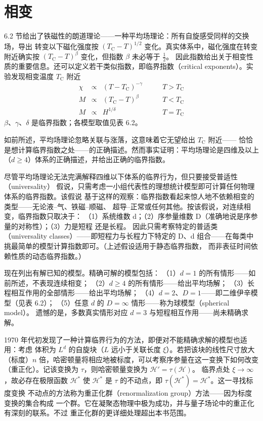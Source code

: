 \section{相变}

6.2 节给出了铁磁性的朗道理论——一种平均场理论：所有自旋感受同样的交换场，导出
转变以下磁化强度按 $(T_{\mathrm{C}}-T)^{1/2}$ 变化。真实体系中，磁化强度在转变
附近确实按 $(T_{\mathrm{C}}-T)^{\beta}$ 变化，但指数 $\beta$ 未必等于 $\frac{1}{2}$。
因此指数给出关于相变性质的重要信息。还可以定义若干类似指数，即临界指数（critical
exponents）。实验发现相变温度 $T_{\mathrm{C}}$ 附近
\begin{equation*}
\begin{array}{cccl}
\chi & \propto & (T-T_{\mathrm{C}})^{-\gamma} & \qquad T>T_{\mathrm{C}}\\
M & \propto & (T_{\mathrm{C}}-T)^{\beta} & \qquad T<T_{\mathrm{C}}\\
M & \propto & H^{1/\delta} & \qquad T=T_{\mathrm{C}}
\end{array}\tag{6.7}
\end{equation*}
$\beta$、$\gamma$、$\delta$ 是临界指数；各模型取值见表 6.2。

如前所述，平均场理论忽略关联与涨落，这意味着它无望给出 $T_{\mathrm{C}}$ 附近——
恰恰是想计算临界指数之处——的正确描述。然而事实证明：平均场理论是四维及以上
（$d\geq4$）体系的正确描述，并给出正确的临界指数。

尽管平均场理论无法完满解释四维以下体系的临界行为，但只要接受普适性（universality）
假说，只需考虑一小组代表性的理想统计模型即可计算任何物理体系的临界指数。该假说
基于这样的观察：临界指数看起来惊人地不依赖相变的类型——无论液--气、铁磁--顺磁、
超导--正常或任何其他。按该假说，对连续相变，临界指数只取决于：
（1）系统维数 d；（2）序参量维数 D（准确地说是序参量的对称性）；（3）力是短程
还是长程。
因此只需考察特定的普适类（universality classes）——即短程力与长程力下特定的
D、d 组合——在每类中挑最简单的模型计算指数即可。（上述假设适用于静态临界指数，
而非表征时间依赖性质的动态临界指数。）

现在列出有解已知的模型。精确可解的模型包括：
（1）$d=1$ 的所有情形——如前所述，不表现连续相变；
（2）$d\geq4$ 的所有情形——给出平均场解；
（3）长程相互作用的全部情形——给出平均场解；
（4）$d=2$、$D=1$——即二维伊辛模型（见表 6.2）；
（5）任意 $d$ 的 $D=\infty$ 情形——称为球模型（spherical model）。
遗憾的是，多数真实情形对应 $d=3$ 与短程相互作用——尚未精确求解。

1970 年代初发现了一种计算临界行为的方法，即便对不能精确求解的模型也适用：考虑
体积为 $L^{d}$ 的自旋块（$L$ 远小于关联长度 $\xi$）。若把该块的线性尺寸放大
（标度）$n$ 倍，哈密顿量将相应地被标度，可以考察序参量在这一变换下如何改变
（重正化）。记该变换为 $\tau$，则哈密顿量变换为 $\mathcal{H}'=\tau(\mathcal{H})$。
临界点处 $\xi\to\infty$，故必存在极限函数 $\mathcal{H}^{*}$ 使 $\mathcal{H}^{*}$
是 $\tau$ 的不动点，即 $\tau(\mathcal{H}^{*})=\mathcal{H}^{*}$。这一寻找标度变换
不动点的方法称为重正化群（renormalization group）方法——因为标度变换的集合构成
一个群。它在凝聚态物理中极为成功，并与量子场论中的重正化有深刻的联系。不过
重正化群的更详细处理超出本书范围。

